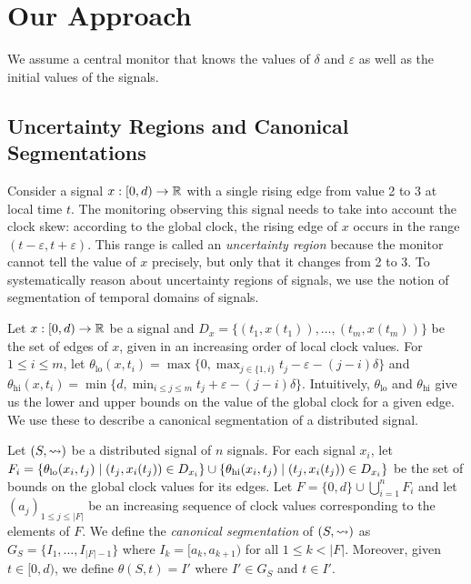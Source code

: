 \section{Our Approach}
We assume a central monitor that knows the values of $\delta$ and $\varepsilon$ as well as the initial values of the signals.

\subsection{Uncertainty Regions and Canonical Segmentations} \label{sec:segment}

Consider a signal $x : [0,d) \to \mathbb{R}$ with a single rising edge from value 2 to 3 at local time $t$.
The monitoring observing this signal needs to take into account the clock skew: according to the global clock, the rising edge of $x$ occurs in the range $(t - \varepsilon, t + \varepsilon)$.
This range is called an \emph{uncertainty region} because the monitor cannot tell the value of $x$ precisely, but only that it changes from 2 to 3.
To systematically reason about uncertainty regions of signals, we use the notion of segmentation of temporal domains of signals.

Let $x : [0,d) \to \mathbb{R}$ be a signal and $D_x = \{(t_1, x(t_1)), \ldots, (t_m, x(t_m))\}$ be the set of edges of $x$, given in an increasing order of local clock values.
For $1 \leq i \leq m$, let $\theta_{\text{lo}}(x,t_i) = \max\{0, \max_{j \in \{1, i\}} t_j - \varepsilon - (j-i)\delta\}$ and $\theta_{\text{hi}}(x,t_i) = \min\{d, \min_{i \leq j \leq m} t_j + \varepsilon - (j-i)\delta\}$.
Intuitively, $\theta_{\text{lo}}$ and $\theta_{\text{hi}}$ give us the lower and upper bounds on the value of the global clock for a given edge.
We use these to describe a canonical segmentation of a distributed signal.

Let $(S,{\rightsquigarrow})$ be a distributed signal of $n$ signals.
For each signal $x_i$, let $F_i = \{\theta_{\text{lo}}(x_i, t_j) \st (t_j, x_i(t_j)) \in D_{x_i}\} \cup \{\theta_{\text{hi}}(x_i, t_j) \st (t_j, x_i(t_j)) \in D_{x_i}\}$ be the set of bounds on the global clock values for its edges.
Let $F = \{0, d\} \cup \bigcup_{i = 1}^{n} F_i$ and let $(a_j)_{1 \leq j \leq |F|}$ be an increasing sequence of clock values corresponding to the elements of $F$.
We define the \emph{canonical segmentation} of $(S,{\rightsquigarrow})$ as $G_S = \{I_1, \ldots, I_{|F| - 1}\}$ where $I_k = [a_k, a_{k+1})$ for all $1 \leq k < |F|$.
Moreover, given $t \in [0,d)$, we define $\theta(S,t) = I'$ where $I' \in G_S$ and $t \in I'$.

